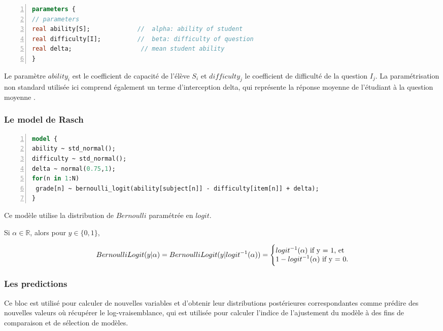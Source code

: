 \begin{lstlisting}[language=Stan,basicstyle=\scriptsize, frame=l,framesep=4.5mm,framexleftmargin=2.5mm,tabsize=2,numbers=left,fillcolor=\color{blueforest!40},rulecolor=\color{blue},numberstyle=\normalfont\tiny\color{white}]
parameters {
// parameters
real ability[S];             //  alpha: ability of student
real difficulty[I];          //  beta: difficulty of question
real delta;                   // mean student ability
}
\end{lstlisting}
Le paramètre  \(\displaystyle ability_{i} \) est le coefficient de capacité de l'élève \(\displaystyle S_{i} \) et \(\displaystyle difficulty_{j} \) le coefficient de difficulté de la question \(\displaystyle I_{j} \). La paramétrisation non standard utilisée ici comprend également un terme d'interception delta, qui représente la réponse moyenne de l'étudiant à la question moyenne \cite{data_analysis_irt}.

\subsubsection{Le model de Rasch}

\begin{lstlisting}[language=Stan,basicstyle=\scriptsize, frame=l,framesep=4.5mm,framexleftmargin=2.5mm,tabsize=2,numbers=left,fillcolor=\color{blueforest!40},rulecolor=\color{blue},numberstyle=\normalfont\tiny\color{white}]
model {
ability ~ std_normal();         
difficulty ~ std_normal();   
delta ~ normal(0.75,1);
for(n in 1:N)
 grade[n] ~ bernoulli_logit(ability[subject[n]] - difficulty[item[n]] + delta);
}
\end{lstlisting}
Ce modèle utilise la distribution de \(\displaystyle Bernoulli \) paramétrée en  \(\displaystyle logit \).

Si \(\displaystyle \alpha \in \mathbb{R} \), alors pour \(\displaystyle y \in \{ 0,1 \} \), 

\begin{equation}
    BernoulliLogit(y|\alpha) = BernoulliLogit(y|logit^{-1} (\alpha)) = \Bigg \{ 
\begin{tabular}{@{}l@{}}
    \(\displaystyle logit^{-1} (\alpha)\)  if y = 1, et \\
    \(\displaystyle 1-logit^{-1}(\alpha) \)  if y = 0. 
\end{tabular}
\end{equation}


\subsubsection{Les predictions}
Ce bloc est utilisé pour calculer de nouvelles variables et d'obtenir leur distributions postérieures correspondantes comme prédire des nouvelles valeurs où récupérer le log-vraisemblance, qui est utilisée pour calculer l’indice de l'ajustement du modèle à des fins de comparaison et de sélection de modèles.

